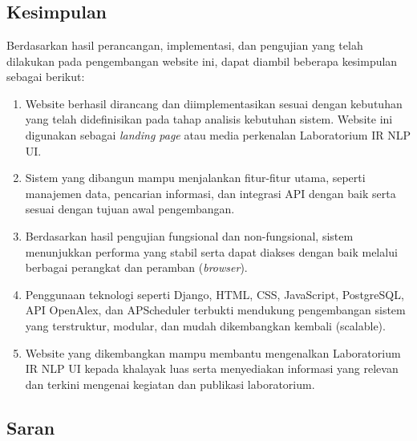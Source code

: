 \chapter{\kesimpulan}

\section{Kesimpulan}

Berdasarkan hasil perancangan, implementasi, dan pengujian yang telah dilakukan pada pengembangan website ini, dapat diambil beberapa kesimpulan sebagai berikut:

\begin{enumerate}
	\item Website berhasil dirancang dan diimplementasikan sesuai dengan kebutuhan yang telah didefinisikan pada tahap analisis kebutuhan sistem. Website ini digunakan sebagai \textit{landing page} atau media perkenalan Laboratorium IR NLP UI. 
	
	\item Sistem yang dibangun mampu menjalankan fitur-fitur utama, seperti manajemen data, pencarian informasi, dan integrasi API dengan baik serta sesuai dengan tujuan awal pengembangan.
	
	\item Berdasarkan hasil pengujian fungsional dan non-fungsional, sistem menunjukkan performa yang stabil serta dapat diakses dengan baik melalui berbagai perangkat dan peramban (\textit{browser}).
	
	\item Penggunaan teknologi seperti Django, HTML, CSS, JavaScript, PostgreSQL, API OpenAlex, dan APScheduler terbukti mendukung pengembangan sistem yang terstruktur, modular, dan mudah dikembangkan kembali (scalable).
	
	\item Website yang dikembangkan mampu membantu mengenalkan Laboratorium IR NLP UI kepada khalayak luas serta menyediakan informasi yang relevan dan terkini mengenai kegiatan dan publikasi laboratorium.
\end{enumerate}


\section{Saran}


